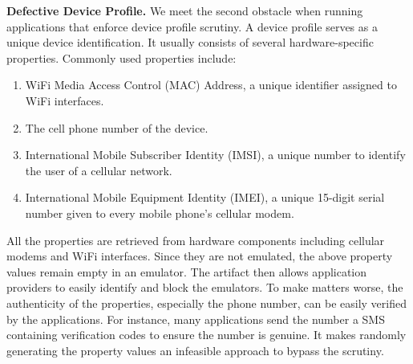 \documentclass[conference]{IEEEtranl}
\begin{document}
	\textbf{Defective Device Profile.} We meet the second obstacle when running applications that enforce device profile scrutiny. A device profile serves as a unique device identification. It usually consists of several hardware-specific properties. Commonly used properties include:
	\begin{enumerate}
	\item WiFi Media Access Control (MAC) Address, a unique identifier assigned to WiFi interfaces.
	\item The cell phone number of the device.
	\item International Mobile Subscriber Identity (IMSI), a unique number to identify the user of a cellular network.
	\item International Mobile Equipment Identity (IMEI), a unique 15-digit serial number given to every mobile phone's cellular modem.
	\end{enumerate}
	All the properties are retrieved from hardware components including cellular modems and WiFi interfaces. Since they are not emulated,  the above property values remain empty in an emulator. The artifact then allows application providers to easily identify and block the emulators. To make matters worse, the authenticity of the properties, especially the phone number, can be easily verified by the applications. For instance, many applications send the number a SMS containing verification codes to ensure the number is genuine. It makes randomly generating the property values an infeasible approach to bypass the scrutiny.



\end{document}

